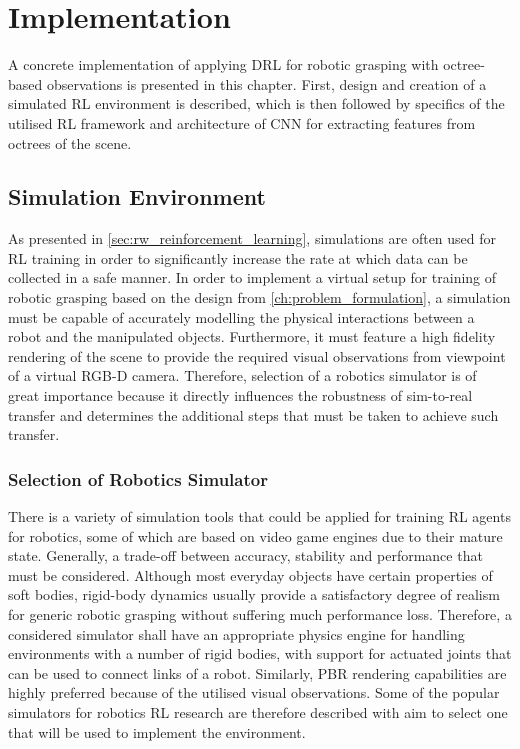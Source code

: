 \chapter{Implementation}\label{ch:implementation}

A concrete implementation of applying DRL for robotic grasping with octree-based observations is presented in this chapter. First, design and creation of a simulated RL environment is described, which is then followed by specifics of the utilised RL framework and architecture of CNN for extracting features from octrees of the scene.


\section{Simulation Environment}

As presented in \autoref{sec:rw_reinforcement_learning}, simulations are often used for RL training in order to significantly increase the rate at which data can be collected in a safe manner. In order to implement a virtual setup for training of robotic grasping based on the design from \autoref{ch:problem_formulation}, a simulation must be capable of accurately modelling the physical interactions between a robot and the manipulated objects. Furthermore, it must feature a high fidelity rendering of the scene to provide the required visual observations from viewpoint of a virtual RGB-D camera. Therefore, selection of a robotics simulator is of great importance because it directly influences the robustness of sim-to-real transfer and determines the additional steps that must be taken to achieve such transfer.


\subsection{Selection of Robotics Simulator}

There is a variety of simulation tools that could be applied for training RL agents for robotics, some of which are based on video game engines due to their mature state. Generally, a trade-off between accuracy, stability and performance that must be considered. Although most everyday objects have certain properties of soft bodies, rigid-body dynamics usually provide a satisfactory degree of realism for generic robotic grasping without suffering much performance loss. Therefore, a considered simulator shall have an appropriate physics engine for handling environments with a number of rigid bodies, with support for actuated joints that can be used to connect links of a robot. Similarly, PBR rendering capabilities are highly preferred because of the utilised visual observations. Some of the popular simulators for robotics RL research are therefore described with aim to select one that will be used to implement the environment.


